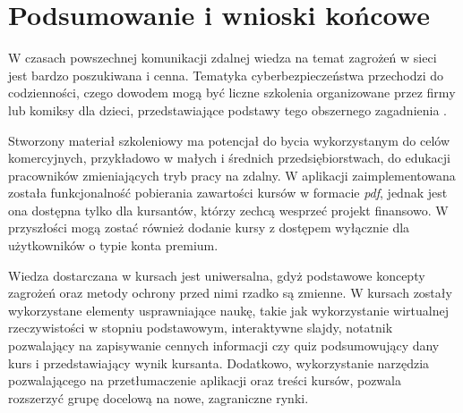 \documentclass[12pt,twoside]{article}
\begin{document}
\section{Podsumowanie i wnioski końcowe}

W czasach powszechnej komunikacji zdalnej wiedza na temat zagrożeń w sieci jest bardzo poszukiwana i cenna. Tematyka cyberbezpieczeństwa przechodzi do codzienności, czego dowodem mogą być liczne szkolenia organizowane przez firmy lub komiksy dla dzieci, przedstawiające podstawy tego obszernego zagadnienia \cite{Edukomiks}.


Stworzony materiał szkoleniowy ma potencjał do bycia wykorzystanym do celów komercyjnych, przykładowo w małych i średnich przedsiębiorstwach, do edukacji pracowników zmieniających tryb pracy na zdalny. W aplikacji zaimplementowana została funkcjonalność pobierania zawartości kursów w formacie \emph{pdf}, jednak jest ona dostępna tylko dla kursantów, którzy zechcą wesprzeć projekt finansowo. W przyszłości mogą zostać również dodanie kursy z dostępem wyłącznie dla użytkowników o typie konta premium. 

Wiedza dostarczana w kursach jest uniwersalna, gdyż podstawowe koncepty zagrożeń oraz metody ochrony przed nimi rzadko są zmienne. W kursach zostały wykorzystane elementy usprawniające naukę, takie jak wykorzystanie wirtualnej rzeczywistości w stopniu podstawowym, interaktywne slajdy, notatnik pozwalający na zapisywanie cennych informacji czy quiz podsumowujący dany kurs i przedstawiający wynik kursanta. Dodatkowo, wykorzystanie narzędzia pozwalającego na przetłumaczenie aplikacji oraz treści kursów, pozwala rozszerzyć grupę docelową na nowe, zagraniczne rynki.
\end{document}
